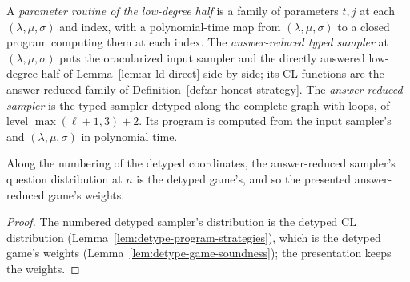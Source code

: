 \begin{definition}
\label{def:ar-sampler}
\leanok
A \emph{parameter routine of the low-degree half} is a family of parameters $t, j$ at each
$(\lambda, \mu, \sigma)$ and index, with a polynomial-time map from $(\lambda, \mu, \sigma)$ to a
closed program computing them at each index. The \emph{answer-reduced typed sampler} at
$(\lambda, \mu, \sigma)$ puts the oracularized input sampler and the directly answered low-degree
half of Lemma~\ref{lem:ar-ld-direct} side by side; its CL functions are the answer-reduced family of
Definition~\ref{def:ar-honest-strategy}. The \emph{answer-reduced sampler} is the typed sampler
detyped along the complete graph with loops, of level $\max(\ell + 1, 3) + 2$. Its program is
computed from the input sampler's and $(\lambda, \mu, \sigma)$ in polynomial time.
\end{definition}

\begin{lemma}
\label{lem:ar-sampler-dist}
\leanok
Along the numbering of the detyped coordinates, the answer-reduced sampler's question distribution
at $n$ is the detyped game's, and so the presented answer-reduced game's weights.
\end{lemma}

\begin{proof}
\leanok
The numbered detyped sampler's distribution is the detyped CL distribution
(Lemma~\ref{lem:detype-program-strategies}), which is the detyped game's weights
(Lemma~\ref{lem:detype-game-soundness}); the presentation keeps the weights.
\end{proof}

